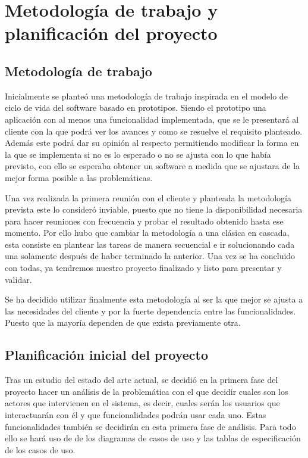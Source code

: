 \section{Metodología de trabajo y planificación del proyecto}
\subsection{Metodología de trabajo}
Inicialmente se planteó una metodología de trabajo inspirada en el modelo de ciclo de vida del software
basado en prototipos. Siendo el prototipo una aplicación con al menos una funcionalidad implementada,
que se le presentará al cliente con la que podrá ver los avances y como se resuelve el requisito planteado.
Además este podrá dar su opinión al respecto permitiendo modificar la forma en la que se implementa si no
es lo esperado o no se ajusta con lo que había previsto, con ello se esperaba obtener un software a
medida que se ajustara de la mejor forma posible a las problemáticas.

\medskip
Una vez realizada la primera reunión con el cliente y planteada la metodología prevista este lo consideró
inviable, puesto que no tiene la disponibilidad necesaria para hacer reuniones con frecuencia y probar el
resultado obtenido hasta ese momento. Por ello hubo que cambiar la metodología a una clásica en cascada,
esta consiste en plantear las tareas de manera secuencial e ir solucionando cada una solamente después de
haber terminado la anterior. Una vez se ha concluido con todas, ya tendremos nuestro proyecto finalizado
y listo para presentar y validar.

\medskip
Se ha decidido utilizar finalmente esta metodología al ser la que mejor se ajusta a las necesidades del
cliente y por la fuerte dependencia entre las funcionalidades. Puesto que la mayoría dependen de que
exista previamente otra.

\subsection{Planificación inicial del proyecto}
Tras un estudio del estado del arte actual, se decidió en la primera fase del proyecto hacer un análisis
de la problemática con el que decidir cuales son los actores que intervienen en el sistema, es decir,
cuales serán los usuarios que interactuarán con él y que funcionalidades podrán usar cada uno. Estas
funcionalidades también se decidirán en esta primera fase de análisis. Para todo ello se hará uso de
de los diagramas de casos de uso\cite{casos-de-uso} y las tablas de especificación de los casos de
uso\cite{tabla-especificacion-casos-de-uso}.

